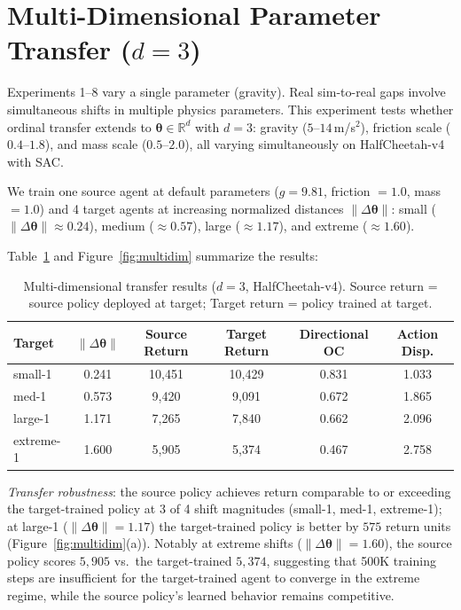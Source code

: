 \documentclass{article}
\newcommand{\thetavec}{\boldsymbol{\theta}}
\newcommand{\R}{\mathbb{R}}
\begin{document}
\section{Multi-Dimensional Parameter Transfer (\texorpdfstring{$d = 3$}{d = 3})}
\label{app:exp-multidim}

Experiments 1--8 vary a single parameter (gravity). Real sim-to-real gaps involve simultaneous shifts in multiple physics parameters. This experiment tests whether ordinal transfer extends to $\thetavec \in \R^d$ with $d = 3$: gravity ($5$--$14$\,m/s$^2$), friction scale ($0.4$--$1.8$), and mass scale ($0.5$--$2.0$), all varying simultaneously on HalfCheetah-v4 with SAC.

We train one source agent at default parameters ($g = 9.81$, friction $= 1.0$, mass $= 1.0$) and 4 target agents at increasing normalized distances $\|\Delta\thetavec\|$: small ($\|\Delta\thetavec\| \approx 0.24$), medium ($\approx 0.57$), large ($\approx 1.17$), and extreme ($\approx 1.60$).

Table~\ref{tab:multidim} and Figure~\ref{fig:multidim} summarize the results:

\begin{table}[h]
\centering
\caption{Multi-dimensional transfer results ($d=3$, HalfCheetah-v4). Source return = source policy deployed at target; Target return = policy trained at target.}
\label{tab:multidim}
\begin{tabular}{lccccc}
\toprule
Target & $\|\Delta\thetavec\|$ & Source Return & Target Return & Directional OC & Action Disp. \\
\midrule
small-1   & 0.241 & 10{,}451 & 10{,}429 & 0.831 & 1.033 \\
med-1     & 0.573 &  9{,}420 &  9{,}091 & 0.672 & 1.865 \\
large-1   & 1.171 &  7{,}265 &  7{,}840 & 0.662 & 2.096 \\
extreme-1 & 1.600 &  5{,}905 &  5{,}374 & 0.467 & 2.758 \\
\bottomrule
\end{tabular}
\end{table}

\emph{Transfer robustness}: the source policy achieves return comparable to or exceeding the target-trained policy at 3 of 4 shift magnitudes (small-1, med-1, extreme-1); at large-1 ($\|\Delta\thetavec\| = 1.17$) the target-trained policy is better by $575$ return units (Figure~\ref{fig:multidim}(a)). Notably at extreme shifts ($\|\Delta\thetavec\| = 1.60$), the source policy scores $5{,}905$ vs.\ the target-trained $5{,}374$, suggesting that 500K training steps are insufficient for the target-trained agent to converge in the extreme regime, while the source policy's learned behavior remains competitive.
\end{document}
